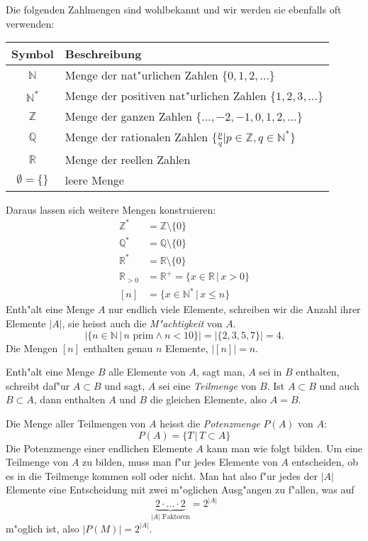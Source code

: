 Die folgenden Zahlmengen sind wohlbekannt und wir werden sie ebenfalls
oft verwenden:
\begin{center}
\begin{tabular}{|c|l|}
\hline
Symbol&Beschreibung\\
\hline
\index{nat\"urliche Zahlen}
$\mathbb N$&Menge der nat"urlichen Zahlen $\{0,1,2,\dots\}$\\
$\mathbb N^*$&Menge der positiven nat"urlichen Zahlen $\{1,2,3,\dots\}$\\
\index{ganze Zahlen}
$\mathbb Z$&Menge der ganzen Zahlen $\{\dots,-2,-1,0,1,2,\dots\}$\\
\index{rationale Zahlen}
$\mathbb Q$&Menge der rationalen Zahlen $\{\frac{p}{q}|p\in\mathbb Z,q\in\mathbb N^*\}$\\
\index{reelle Zahlen}
$\mathbb R$&Menge der reellen Zahlen\\
\index{leere Menge}
$\emptyset=\{\}$&leere Menge\\
\hline
\end{tabular}
\end{center}
Daraus lassen sich weitere Mengen konstruieren:
\begin{align*}
\mathbb Z^*&=\mathbb Z\setminus \{0\}\\
\mathbb Q^*&=\mathbb Q\setminus \{0\}\\
\mathbb R^*&=\mathbb R\setminus \{0\}\\
\mathbb R_{> 0}&=\mathbb R^+=\{x\in\mathbb R\,|\,x>0\}\\
[n]&=\{x\in \mathbb N^*\,|\,x\le n\}
\end{align*}
Enth"alt eine Menge $A$ nur endlich viele Elemente, schreiben wir die Anzahl
ihrer Elemente $|A|$, sie heisst auch die {\em M"achtigkeit} von $A$.
\[
|\{n\in\mathbb N\,|\,\text{$n$ prim}\wedge n<10\}|=|\{2,3,5,7\}|=4.
\]
Die Mengen $[n]$ enthalten genau $n$ Elemente, $|[n]|=n$.

Enth"alt eine Menge $B$ alle Elemente von $A$, sagt man, $A$ sei in $B$
enthalten, schreibt daf"ur $A\subset B$ und sagt, $A$ sei eine
{\em Teilmenge} von $B$. Ist $A\subset B$ und auch
$B\subset A$, dann enthalten $A$ und $B$ die gleichen Elemente, also
$A=B$.

Die Menge aller Teilmengen von $A$ heisst die {\em Potenzmenge} $P(A)$ von $A$:
\[
P(A)=\{ T\,|\,T\subset A\}
\]
Die Potenzmenge einer endlichen Elemente $A$ kann man wie folgt bilden.
Um eine Teilmenge von $A$ zu bilden, muss man f"ur jedes Elemente
von $A$ entscheiden, ob es in die Teilmenge kommen soll oder nicht.
Man hat also f"ur jedes der $|A|$ Elemente eine Entscheidung mit zwei
m"oglichen Ausg"angen zu f"allen, was auf
\[
\underbrace{2\cdot\dots\cdot 2}_{\text{$|A|$ Faktoren}}=2^{|A|}
\]
m"oglich ist, also $|P(M)|=2^{|A|}$.

